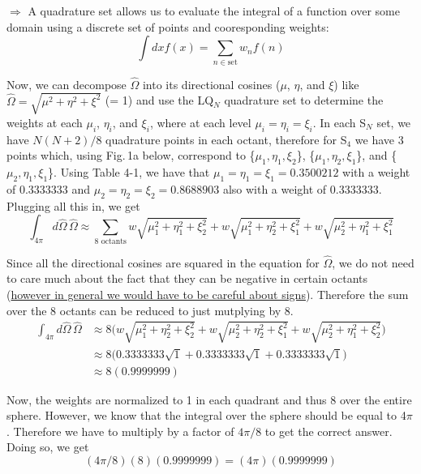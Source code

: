\documentclass[10pt]{article}
\begin{document}
$\Rightarrow$ A quadrature set allows us to evaluate the integral of a function over some domain using a discrete set of points and cooresponding weights:
%
\begin{equation*}
    \int dx f(x) = \sum_{n \in \textrm{set}} w_n f(n)
\end{equation*}

Now, we can decompose $\hat{\Omega}$ into its directional cosines ($\mu$, $\eta$, and $\xi$) like $\hat{\Omega} = \sqrt{\mu^2 + \eta^2 + \xi^2}$ (= 1) and use the LQ$_N$ quadrature set to determine the weights at each $\mu_i$, $\eta_i$, and $\xi_i$, where at each level $\mu_i = \eta_i = \xi_i$. In each S$_N$ set, we have $N(N+2)/8$ quadrature points in each octant, therefore for S$_4$ we have 3 points which, using Fig.\,1a below, correspond to \{$\mu_1, \eta_1, \xi_2$\}, \{$\mu_1, \eta_2, \xi_1$\}, and \{$\mu_2, \eta_1, \xi_1$\}. Using Table 4-1, we have that $\mu_1 = \eta_1 = \xi_1 = 0.3500212$ with a weight of 0.3333333 and $\mu_2 = \eta_2 = \xi_2 = 0.8688903$ also with a weight of 0.3333333. Plugging all this in, we get
%
\begin{equation*}
    \int_{4\pi} d\hat{\Omega}\,\hat{\Omega} \approx \sum_{\textrm{8 octants}} w\sqrt{\mu_1^2 + \eta_1^2 + \xi_2^2} + w\sqrt{\mu_1^2 + \eta_2^2 + \xi_1^2} + w\sqrt{\mu_2^2 + \eta_1^2 + \xi_1^2}
\end{equation*}

Since all the directional cosines are squared in the equation for $\hat{\Omega}$, we do not need to care much about the fact that they can be negative in certain octants (\ul{however in general we would have to be careful about signs}). Therefore the sum over the 8 octants can be reduced to just mutplying by 8.
%
\begin{align*}
        \int_{4\pi} d\hat{\Omega}\,\hat{\Omega} &\approx 8 \Big( w\sqrt{\mu_1^2 + \eta_2^2 + \xi_2^2} + w\sqrt{\mu_2^2 + \eta_2^2 + \xi_1^2} + w\sqrt{\mu_2^2 + \eta_1^2 + \xi_2^2} \Big) \\
        &\approx 8 \Big( 0.3333333\sqrt{1} + 0.3333333\sqrt{1} + 0.3333333\sqrt{1} \Big) \\
        &\approx 8 (0.9999999)
\end{align*}

Now, the weights are normalized to 1 in each quadrant and thus 8 over the entire sphere. However, we know that the integral over the sphere should be equal to 4$\pi$. Therefore we have to multiply by a factor of $4\pi /8$ to get the correct answer. Doing so, we get
%
\begin{equation*}
    (4\pi/8)(8)(0.9999999) = (4\pi)(0.9999999)
\end{equation*}
\end{document}
